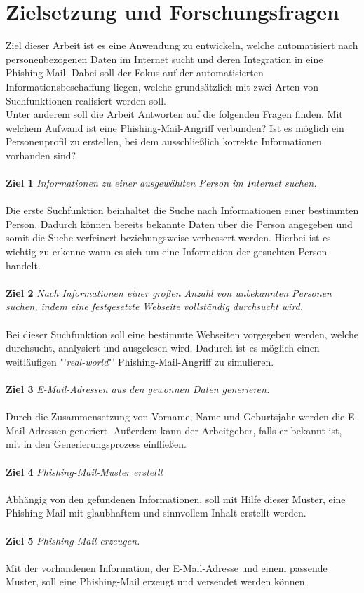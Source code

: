 \section{Zielsetzung und Forschungsfragen}
\label {sec:Zielsetzung}
Ziel dieser Arbeit ist es eine Anwendung zu entwickeln, welche automatisiert nach personenbezogenen Daten im Internet sucht und deren Integration in eine Phishing-Mail. Dabei soll der Fokus auf der automatisierten Informationsbeschaffung liegen, welche grundsätzlich mit zwei Arten von Suchfunktionen realisiert werden soll.\\ 
Unter anderem soll die Arbeit Antworten auf die folgenden Fragen finden. Mit welchem Aufwand ist eine Phishing-Mail-Angriff verbunden? Ist es möglich ein Personenprofil zu erstellen, bei dem ausschließlich korrekte Informationen vorhanden sind?
 \\\\
 {\bf Ziel 1} \textit{Informationen zu einer ausgewählten Person im Internet suchen.}\\\\
 Die erste Suchfunktion beinhaltet die Suche nach Informationen einer bestimmten Person. Dadurch können bereits bekannte Daten über die Person angegeben und somit die Suche verfeinert beziehungsweise verbessert werden. Hierbei ist es wichtig zu erkenne wann es sich um eine Information der gesuchten Person handelt.\\\\
 {\bf Ziel 2} \textit{Nach Informationen einer großen Anzahl von unbekannten Personen suchen, indem eine festgesetzte Webseite vollständig durchsucht wird.}\\\\
 Bei dieser Suchfunktion soll eine bestimmte Webseiten vorgegeben werden, welche durchsucht, analysiert und ausgelesen wird. Dadurch ist es möglich einen weitläufigen "'\textit{real-world}"' Phishing-Mail-Angriff zu simulieren.\\\\
 {\bf Ziel 3} \textit{E-Mail-Adressen aus den gewonnen Daten generieren.}\\\\
 Durch die Zusammensetzung von Vorname, Name und Geburtsjahr werden die E-Mail-Adressen generiert. Außerdem kann der Arbeitgeber, falls er bekannt ist, mit in den Generierungsprozess einfließen.\\\\
 {\bf Ziel 4} \textit{Phishing-Mail-Muster erstellt}\\\\
 Abhängig von den gefundenen Informationen, soll mit Hilfe dieser Muster, eine Phishing-Mail mit glaubhaftem und sinnvollem Inhalt erstellt werden.\\\\
 {\bf Ziel 5} \textit{Phishing-Mail erzeugen.}\\\\
 Mit der vorhandenen Information, der E-Mail-Adresse und einem passende Muster, soll eine Phishing-Mail erzeugt und versendet werden können.
 
